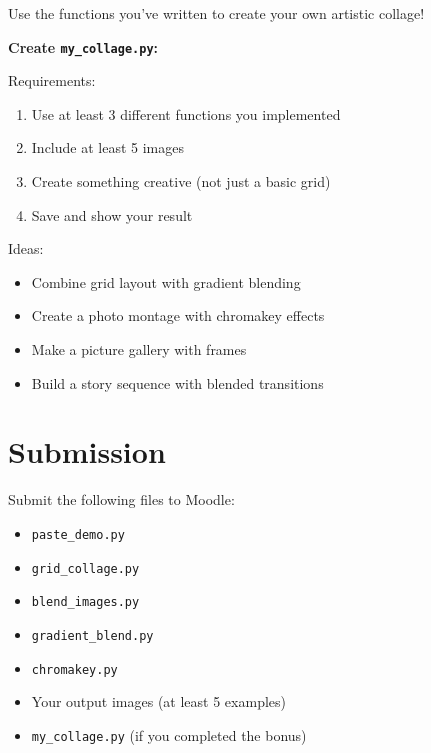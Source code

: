 \documentclass[11pt]{article}
\begin{document}
Use the functions you've written to create your own artistic collage!

\textbf{Create \texttt{my\_collage.py}:}

Requirements:
\begin{enumerate}
    \item Use at least 3 different functions you implemented
    \item Include at least 5 images
    \item Create something creative (not just a basic grid)
    \item Save and show your result
\end{enumerate}

Ideas:
\begin{itemize}
    \item Combine grid layout with gradient blending
    \item Create a photo montage with chromakey effects
    \item Make a picture gallery with frames
    \item Build a story sequence with blended transitions
\end{itemize}

\section{Submission}

Submit the following files to Moodle:
\begin{itemize}
    \item \texttt{paste\_demo.py}
    \item \texttt{grid\_collage.py}
    \item \texttt{blend\_images.py}
    \item \texttt{gradient\_blend.py}
    \item \texttt{chromakey.py}
    \item Your output images (at least 5 examples)
    \item \texttt{my\_collage.py} (if you completed the bonus)
\end{itemize}
\end{document}
